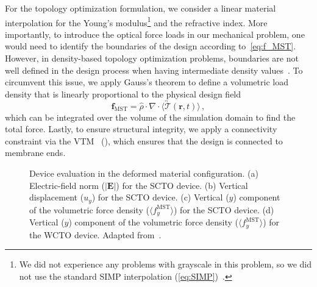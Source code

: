  For the topology optimization formulation, we consider a linear material interpolation for the Young's modulus\footnote{We did not experience any problems with grayscale in this problem, so we did not use the standard SIMP interpolation (\eqref{eq:SIMP})~\cite{SIMP}.} and the 
 refractive index. More importantly, to introduce the optical force loads in our mechanical problem, one would need to identify the boundaries of the design according to~\eqref{eq:f_MST}. However, in density-based topology optimization problems, boundaries
 are not well defined in the design process when having intermediate density values~\cite{jdara}. To circumvent this issue, we apply Gauss's theorem to
 define a volumetric load density that is linearly proportional to the physical design field
    \begin{equation}
 \mathbf{f}_\text{MST} = \hat{\rho} \cdot \nabla \cdot \langle\overleftrightarrow{\bm{\mathcal{T}}}(\mathbf{r}, t)\rangle \,,
    \end{equation}
 which can be integrated over the volume of the simulation domain to find the total force. Lastly, to ensure structural integrity, we apply a connectivity constraint via the VTM~\cite{li_structural_2016} (), which ensures that the design is connected to membrane ends. 

\begin{figure}[tb]
    \centering
    \caption{Device evaluation in the deformed material configuration. (a) Electric-field norm ($\vert\mathbf{E}\vert$) for the SCTO device. (b) Vertical displacement ($u_y$) for the SCTO device.
     (c) Vertical ($y$) component of the volumetric force density ($\langle f^\text{MST}_y\rangle$) for the SCTO device. (d) Vertical ($y$) component of
      the volumetric force density ($\langle f^\text{MST}_y\rangle$) for the WCTO device. Adapted from~\cite{ownpub5}.}
    \label{fig:SC}
\end{figure}


